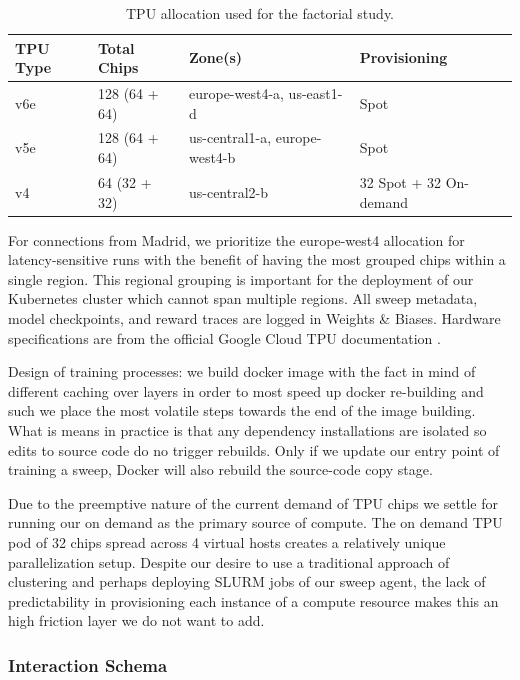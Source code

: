 \begin{table}[ht]
\centering
\caption{TPU allocation used for the factorial study.}
\label{tab:tpu_allocation}
\begin{tabular}{@{}llll@{}}
\toprule
\textbf{TPU Type} & \textbf{Total Chips} & \textbf{Zone(s)} & \textbf{Provisioning} \\
\midrule
v6e & 128 (64 + 64) & europe-west4-a, us-east1-d & Spot \\
v5e & 128 (64 + 64) & us-central1-a, europe-west4-b & Spot \\
v4 & 64 (32 + 32) & us-central2-b & 32 Spot + 32 On-demand \\
\bottomrule
\end{tabular}
\end{table}

For connections from Madrid, we prioritize the europe-west4 allocation for latency-sensitive runs with the benefit of having the most grouped chips within a single region. This regional grouping is important for the deployment of our Kubernetes cluster which cannot span multiple regions. All sweep metadata, model checkpoints, and reward traces are logged in Weights \& Biases. Hardware specifications are from the official Google Cloud TPU documentation \parencite{noauthor_tpu_2026,noauthor_tpu_2025-1,noauthor_tpu_2025}.

Design of training processes: we build docker image with the fact in mind of different caching over layers in order to most speed up docker re-building and such we place the most volatile steps towards the end of the image building. What is means in practice is that any dependency installations are isolated so edits to source code do no trigger rebuilds. Only if we update our entry point of training a sweep, Docker will also rebuild the source-code copy stage.

Due to the preemptive nature of the current demand of TPU chips we settle for running our on demand as the primary source of compute. The on demand TPU pod of 32 chips spread across 4 virtual hosts creates a relatively unique parallelization setup. Despite our desire to use a traditional approach of clustering and perhaps deploying SLURM jobs of our sweep agent, the lack of predictability in provisioning each instance of a compute resource makes this an high friction layer we do not want to add.

\subsubsection{Interaction Schema}

